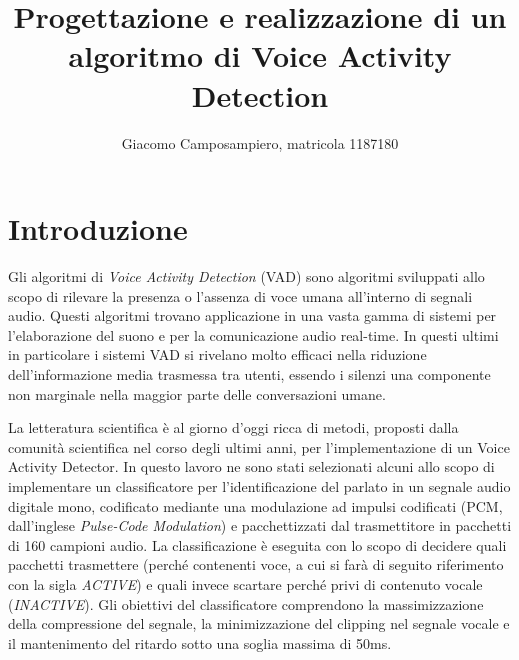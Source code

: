 \documentclass[10pt,twocolumn]{article}
\title{\textbf{Progettazione e realizzazione di un algoritmo di Voice Activity Detection}}
\author{Giacomo Camposampiero, matricola 1187180}
\begin{document}
\maketitle

\section{Introduzione}
{Gli algoritmi di \textit{Voice Activity Detection} (VAD) sono algoritmi sviluppati allo scopo di rilevare la
presenza o l'assenza di voce umana all'interno di segnali audio. Questi algoritmi trovano applicazione in una vasta gamma di sistemi per l'elaborazione del suono e per la comunicazione audio real-time. In questi ultimi in particolare i sistemi VAD si rivelano molto efficaci nella riduzione dell'informazione media trasmessa tra utenti, essendo i silenzi una componente non marginale nella maggior parte delle conversazioni umane.

\vspace{0.1cm}
La letteratura scientifica è al giorno d'oggi ricca di metodi, proposti dalla comunità scientifica nel corso
degli ultimi anni, per l'implementazione di un Voice Activity Detector. 
In questo lavoro ne sono stati selezionati alcuni allo scopo di implementare un classificatore per
l'identificazione del parlato in un segnale audio digitale mono, codificato mediante una modulazione ad impulsi
codificati (PCM, dall'inglese \textit{Pulse-Code Modulation}) e pacchettizzati dal trasmettitore in pacchetti di
160 campioni audio. La classificazione è eseguita con lo scopo di decidere quali pacchetti trasmettere
(perché contenenti voce, a cui si farà di seguito riferimento con la sigla \textsl{ACTIVE}) e quali invece
scartare perché privi di contenuto vocale (\textsl{INACTIVE}). 
Gli obiettivi del classificatore comprendono la massimizzazione della compressione del
segnale, la minimizzazione del clipping nel segnale vocale e il mantenimento del ritardo sotto una soglia
massima di 50ms. 

}
\end{document}
